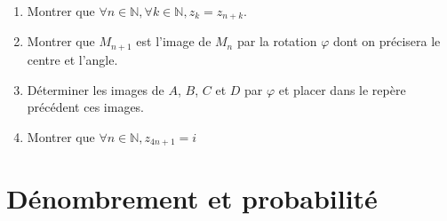 \documentclass[12pts]{book}
\begin{document}
\begin{enumerate}
\begin{enumerate}
					\begin{enumerate}
						\item Montrer que $\forall n \in \mathbb{N}, \forall k \in \mathbb{N}, z_k=z_{n+k}$.
						\item Montrer que $M_{n+1}$ est l'image de $M_n$ par la rotation $\varphi$ dont on précisera le centre et l'angle.
						\item Déterminer les images de $A$, $B$, $C$ et $D$ par $\varphi$ et placer dans le repère précédent ces images.
						\item Montrer que $\forall n\in \mathbb{N}, z_{4n+1}=i$
					\end{enumerate}
			\end{enumerate}
	\end{enumerate}
	
	\chapter{Dénombrement et probabilité}
\end{document}
